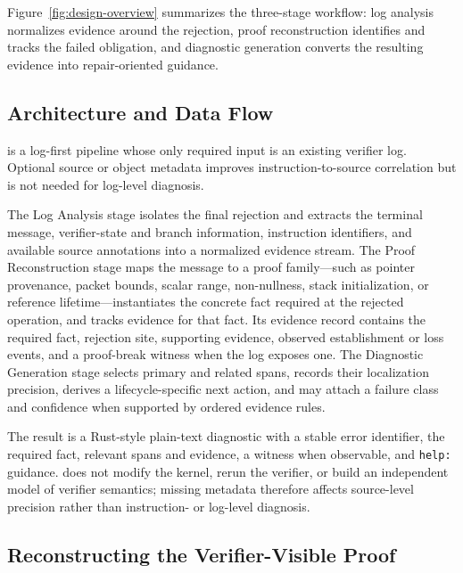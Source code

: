 Figure~\ref{fig:design-overview} summarizes the three-stage workflow: log analysis normalizes evidence around the rejection, proof reconstruction identifies and tracks the failed obligation, and diagnostic generation converts the resulting evidence into repair-oriented guidance.



\subsection{Architecture and Data Flow}
\label{sec:design-architecture}

\sys is a log-first pipeline whose only required input is an existing verifier log. Optional source or object metadata improves instruction-to-source correlation but is not needed for log-level diagnosis.



The Log Analysis stage isolates the final rejection and extracts the terminal message, verifier-state and branch information, instruction identifiers, and available source annotations into a normalized evidence stream. The Proof Reconstruction stage maps the message to a proof family---such as pointer provenance, packet bounds, scalar range, non-nullness, stack initialization, or reference lifetime---instantiates the concrete fact required at the rejected operation, and tracks evidence for that fact. Its evidence record contains the required fact, rejection site, supporting evidence, observed establishment or loss events, and a proof-break witness when the log exposes one. The Diagnostic Generation stage selects primary and related spans, records their localization precision, derives a lifecycle-specific next action, and may attach a failure class and confidence when supported by ordered evidence rules.



The result is a Rust-style plain-text diagnostic with a stable error identifier, the required fact, relevant spans and evidence, a witness when observable, and \texttt{help:} guidance. \sys does not modify the kernel, rerun the verifier, or build an independent model of verifier semantics; missing metadata therefore affects source-level precision rather than instruction- or log-level diagnosis.

\subsection{Reconstructing the Verifier-Visible Proof}
\label{sec:design-proof}

